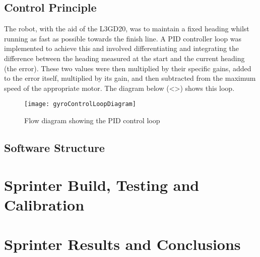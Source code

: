   \subsection{Control Principle}
  \label{sub:Control Principle}
    The robot, with the aid of the L3GD20, was to maintain a fixed heading whilst running as fast as possible towards the finish line. A PID controller loop was implemented to achieve this and involved differentiating and integrating the difference between the heading measured at the start and the current heading (the error). These two values were then multiplied by their specific gains, added to the error itself, multiplied by its gain, and then subtracted from the maximum speed of the appropriate motor. The diagram below (<>) shows this loop.

    \begin{figure}[H]
      \begin{center}
        \texttt{[image: gyroControlLoopDiagram]}
        \caption{Flow diagram showing the PID control loop}
        \label{fig:gyroControlLoopDiagram}
      \end{center}
    \end{figure}

  \subsection{Software Structure}
  \label{sub:Software Structure}


\clearpage
\section{Sprinter Build, Testing and Calibration}
\label{sec:Sprinter Build, Testing and Calibration}

\clearpage
\section{Sprinter Results and Conclusions}
\label{sec:Sprinter Results and Conclusions}


\clearpage
